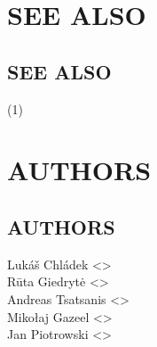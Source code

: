 \documentclass[a4paper,english]{article}
\begin{document}
  \section*{SEE ALSO}
    \begin{adjustwidth}{18pt}{0pt}
  \section{SEE ALSO}
      (1)
    \end{adjustwidth}

  \section*{AUTHORS}
    \begin{adjustwidth}{18pt}{0pt}
  \section{AUTHORS}
    Lukáš Chládek <>\\[0.1cm]\MANbr
    Rūta Giedrytė <>\\[0.1cm]\MANbr
    Andreas Tsatsanis <>\\[0.1cm]\MANbr
    Mikołaj Gazeel <>\\[0.1cm]\MANbr
    Jan Piotrowski <>
    \end{adjustwidth}
\end{document}
